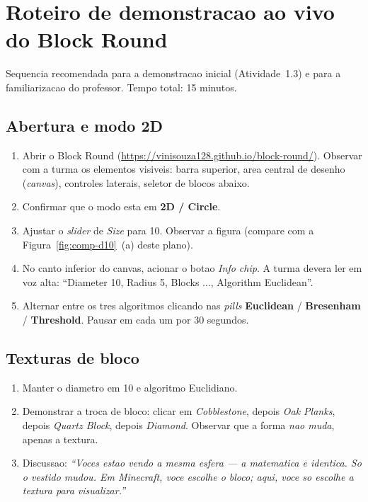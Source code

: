 \documentclass[12pt,a4paper]{scrartcl}
\newcommand{\acc}[1]{\textcolor{accent}{\textbf{#1}}}
\begin{document}
\newpage
\appendix
\renewcommand{\thesection}{\Alph{section}}
\setcounter{section}{0}

\section{Roteiro de demonstracao ao vivo do Block Round}\label{ap:roteiro}

Sequencia recomendada para a demonstracao inicial (Atividade~1.3) e para a familiarizacao do professor. Tempo total: 15 minutos.

\subsection{Abertura e modo 2D}
\begin{enumerate}[leftmargin=1.5em,itemsep=0.15em,topsep=0.3em]
  \item Abrir o Block Round (\url{https://vinisouza128.github.io/block-round/}). Observar com a turma os elementos visiveis: barra superior, area central de desenho (\emph{canvas}), controles laterais, seletor de blocos abaixo.
  \item Confirmar que o modo esta em \acc{2D / Circle}.
  \item Ajustar o \emph{slider} de \emph{Size} para 10. Observar a figura (compare com a Figura~\ref{fig:comp-d10}~(a) deste plano).
  \item No canto inferior do canvas, acionar o botao \emph{Info chip}. A turma devera ler em voz alta: \enquote{Diameter 10, Radius 5, Blocks $\dots$, Algorithm Euclidean}.
  \item Alternar entre os tres algoritmos clicando nas \emph{pills} \acc{Euclidean} / \acc{Bresenham} / \acc{Threshold}. Pausar em cada um por 30 segundos.
\end{enumerate}

\subsection{Texturas de bloco}

\begin{enumerate}[leftmargin=1.5em,itemsep=0.15em,topsep=0.3em]
  \item Manter o diametro em 10 e algoritmo Euclidiano.
  \item Demonstrar a troca de bloco: clicar em \emph{Cobblestone}, depois \emph{Oak Planks}, depois \emph{Quartz Block}, depois \emph{Diamond}. Observar que a forma \emph{nao muda}, apenas a textura.
  \item Discussao: \emph{\enquote{Voces estao vendo a mesma esfera --- a matematica e identica. So o vestido mudou. Em Minecraft, voce escolhe o bloco; aqui, voce so escolhe a textura para visualizar.}}
\end{enumerate}
\end{document}
